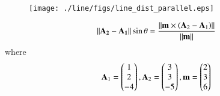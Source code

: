 \begin{enumerate}[label=\arabic*.,ref=\thesubsection.\theenumi]
%
\begin{figure}
\centering
\texttt{[image: ./line/figs/line\_dist\_parallel.eps]}
\caption{}
\label{fig:line_dist_parallel}
\end{figure}
%
\begin{align}
\label{eq:line_dist_parallel}
\mathbf{\left\lVert\mathbf{A}_2-
\mathbf{A}_1\right\rVert}\sin\theta =\frac{\left\lVert\mathbf{m}\times \left(\mathbf{A}_2-
\mathbf{A}_1\right)\right\rVert}{\left\lVert\mathbf{m}\right\rVert}
\end{align}
%
where 
%
\begin{align}
\mathbf{A}_1 = \begin{pmatrix}1\\2\\-4\end{pmatrix},
\mathbf{A}_2 = \begin{pmatrix}3\\3\\-5\end{pmatrix},
\mathbf{m}=\begin{pmatrix}2 \\ 3 \\6\end{pmatrix}
\end{align}
%


\end{enumerate}
